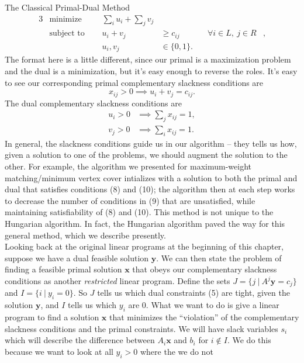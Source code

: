 \documentclass[11pt]{article}
\renewcommand{\'}{^{'}}
\begin{document}
\begin{section}{The Classical Primal-Dual Method}
\begin{alignat}{3}
		& \text{minimize } & \sum_{i}u_i + \sum_jv_j& \\
		& \text{subject to } \quad & u_i + v_j & \geq c_{ij} & \quad \forall 
					i\in L,\ j\in R &, \\
				    && u_i,v_j & \in \{0,1\}.
	\end{alignat}
	The format here is a little different, since our primal is a maximization problem and the dual 
	is a minimization, but it's easy enough to reverse the roles. It's easy to see our 
	corresponding primal complementary slackness conditions are
	\begin{equation}
		x_{ij} > 0 \implies u_i + v_j = c_{ij}.
	\end{equation}
	The dual complementary slackness conditions are
	\begin{align}
		u_i > 0 &\implies \sum_j x_{ij} = 1,\\
		v_j > 0 &\implies \sum_i x_{ij} = 1.
	\end{align}
	In general, the slackness conditions guide us in our algorithm -- they tells us how, given a 
	solution to one of the problems, we should augment the solution to the other. For example, the 
	algorithm we presented for maximum-weight matching/minimum vertex cover intializes with 
	a solution to both the primal and dual that satisfies conditions (8) and (10); the algorithm 
	then at each step works to decrease the number of conditions in (9) that are unsatisfied, while 
	maintaining satisfiability of (8) and (10). This method is not unique to the Hungarian 
	algorithm. In fact, the Hungarian algorithm paved the way for this general method, which we 
	describe presently.\\
	Looking back at the original linear programs at the beginning of this chapter, suppose we have 
	a dual feasible solution $\mathbf{y}$. We can then state the problem of finding a feasible 
	primal 
	solution $\mathbf{x}$ that obeys our complementary slackness conditions as another 
	\emph{restricted} 
	linear program. Define the sets $J = \{j\ |\ A^{j}\mathbf{y} = c_j\}$ and 
	$I = \{i\ |\ y_i = 0\}$. So $J$ tells us which dual constraints (5) are tight, 
	given the solution $\mathbf{y}$, and $I$ tells us which $y_i$ are 0. What we want to do is 
	give a linear program to find a solution $\mathbf{x}$ that minimizes the 
	``violation'' of the complementary slackness conditions and the primal constraints. We will 
	have slack variables $s_i$ which will describe the difference between $A_i\mathbf{x}$ and $b_i$ 
	for $i\notin I$. We do this because we want to look at all $y_i > 0$ where the we do not 

\end{section}
\end{document}
